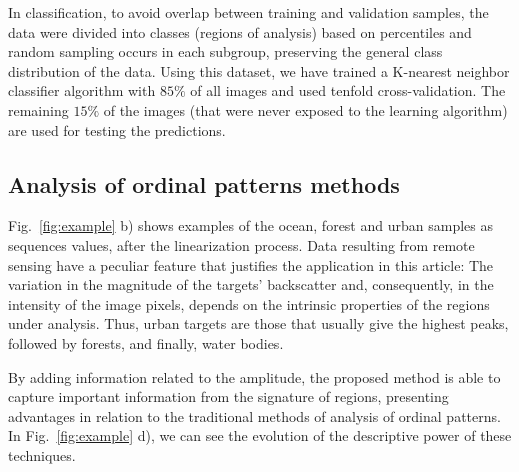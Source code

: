 \documentclass[journal]{IEEEtran}
\begin{document}
In classification, to avoid overlap between training and validation samples, the data were divided into classes (regions of analysis) based on percentiles and random sampling occurs in each subgroup, preserving the general class distribution of the data.
Using this dataset, we have trained a K-nearest neighbor classifier algorithm with $85\%$ of all images and used tenfold cross-validation. 
The remaining $15\%$ of the images (that were never exposed to the learning algorithm) are used for testing the predictions.

\subsection{Analysis of ordinal patterns methods}

Fig.~\ref{fig:example} b) shows examples of the ocean, forest and urban samples as sequences values, after the linearization process.
Data resulting from remote sensing have a peculiar feature that justifies the application in this article:
The variation in the magnitude of the targets' backscatter and, consequently, in the intensity of the image pixels, depends on the intrinsic properties of the regions under analysis.
Thus, urban targets are those that usually give the highest peaks, followed by forests, and finally, water bodies.

By adding information related to the amplitude, the proposed method is able to capture important information from the signature of regions, presenting advantages in relation to the traditional methods of analysis of ordinal patterns.
In Fig.~\ref{fig:example} d), we can see the evolution of the descriptive power of these techniques.
\end{document}
